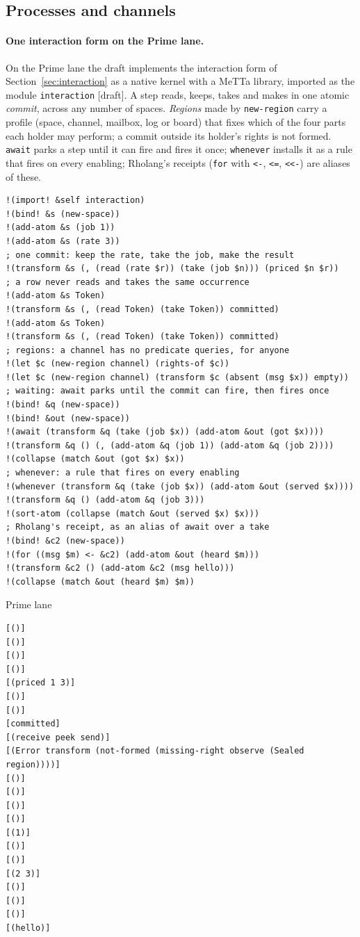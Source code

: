 \documentclass[11pt]{article}
\newcommand{\code}[1]{\texttt{#1}}
\newcommand{\outhead}[1]{{\footnotesize\sffamily #1}\par\vspace{1pt}}
\newcommand{\kind}[1]{\textsf{\small[#1]}}
\begin{document}
\subsection{Processes and channels}
\label{sec:tut-processes}

\paragraph{One interaction form on the Prime lane.}
On the Prime lane the draft implements the interaction form of
Section~\ref{sec:interaction} as a native kernel with a MeTTa library,
imported as the module \code{interaction} \kind{draft}.  A step reads, keeps,
takes and makes in one atomic \emph{commit}, across any number of spaces.
\emph{Regions} made by \code{new-region} carry a profile (space, channel,
mailbox, log or board) that fixes which of the four parts each holder may
perform; a commit outside its holder's rights is not formed.  \code{await}
parks a step until it can fire and fires it once; \code{whenever} installs it
as a rule that fires on every enabling; Rholang's receipts
(\code{for} with \code{<-}, \code{<=}, \code{<<-}) are aliases of these.

\begin{lstlisting}[style=metta,caption={One interaction form on the Prime lane: commits, regions, waiting},label={lst:t09}]
!(import! &self interaction)
!(bind! &s (new-space))
!(add-atom &s (job 1))
!(add-atom &s (rate 3))
; one commit: keep the rate, take the job, make the result
!(transform &s (, (read (rate $r)) (take (job $n))) (priced $n $r))
; a row never reads and takes the same occurrence
!(add-atom &s Token)
!(transform &s (, (read Token) (take Token)) committed)
!(add-atom &s Token)
!(transform &s (, (read Token) (take Token)) committed)
; regions: a channel has no predicate queries, for anyone
!(let $c (new-region channel) (rights-of $c))
!(let $c (new-region channel) (transform $c (absent (msg $x)) empty))
; waiting: await parks until the commit can fire, then fires once
!(bind! &q (new-space))
!(bind! &out (new-space))
!(await (transform &q (take (job $x)) (add-atom &out (got $x))))
!(transform &q () (, (add-atom &q (job 1)) (add-atom &q (job 2))))
!(collapse (match &out (got $x) $x))
; whenever: a rule that fires on every enabling
!(whenever (transform &q (take (job $x)) (add-atom &out (served $x))))
!(transform &q () (add-atom &q (job 3)))
!(sort-atom (collapse (match &out (served $x) $x)))
; Rholang's receipt, as an alias of await over a take
!(bind! &c2 (new-space))
!(for ((msg $m) <- &c2) (add-atom &out (heard $m)))
!(transform &c2 () (add-atom &c2 (msg hello)))
!(collapse (match &out (heard $m) $m))
\end{lstlisting}
\noindent\begin{minipage}[t]{0.98\textwidth}
\outhead{Prime lane}
\begin{lstlisting}[style=out]
[()]
[()]
[()]
[()]
[(priced 1 3)]
[()]
[()]
[committed]
[(receive peek send)]
[(Error transform (not-formed (missing-right observe (Sealed region))))]
[()]
[()]
[()]
[()]
[(1)]
[()]
[()]
[(2 3)]
[()]
[()]
[()]
[(hello)]
\end{lstlisting}
\end{minipage}
\end{document}
